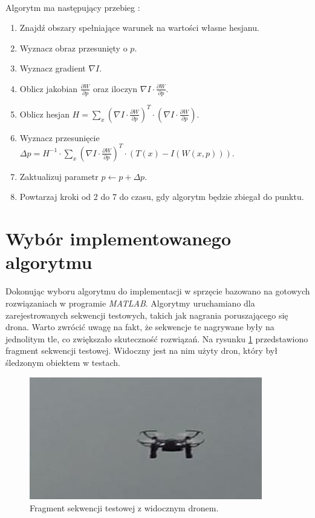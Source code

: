 \paragraph*{}
Algorytm ma następujący przebieg \cite{KK}:
\begin{enumerate}
\item Znajdź obszary spełniające warunek na wartości własne hesjanu.
\item Wyznacz obraz przesunięty o \(p\).
\item Wyznacz gradient \(\nabla I\).
\item Oblicz jakobian \(\frac{\partial W}{\partial p}\) oraz iloczyn \(\nabla I \cdot \frac{\partial W}{\partial p}\).
\item Oblicz hesjan \(H=\sum\limits_x (\nabla I \cdot \frac{\partial W}{\partial p})^T \cdot (\nabla I \cdot \frac{\partial W}{\partial p})\).
\item Wyznacz przesunięcie \(\Delta p=H^{-1} \cdot \sum\limits_x (\nabla I \cdot \frac{\partial W}{\partial p})^T \cdot (T(x)-I(W(x,p)))\).
\item Zaktualizuj parametr \(p \leftarrow p+\Delta p\).
\item Powtarzaj kroki od 2 do 7 do czasu, gdy algorytm będzie zbiegał do punktu.
\end{enumerate}

\section{Wybór implementowanego algorytmu}
\label{sec:wyborimplementowanegoalgorytmu}

Dokonując wyboru algorytmu do implementacji w sprzęcie bazowano na gotowych rozwiązaniach w programie \textit{MATLAB}.
Algorytmy uruchamiano dla zarejestrowanych sekwencji testowych, takich jak nagrania poruszającego się drona. 
Warto zwrócić uwagę na fakt, że sekwencje te nagrywane były na jednolitym tle, co zwiększało skuteczność rozwiązań.
Na rysunku \ref{fig:dron} przedstawiono fragment sekwencji testowej. Widoczny jest na nim użyty dron, który był śledzonym obiektem w testach.

\begin{figure}[h]
	\centering
	\includegraphics[width=4in]{dron.jpg}
	\caption{Fragment sekwencji testowej z widocznym dronem.}
	\label{fig:dron}
\end{figure}

